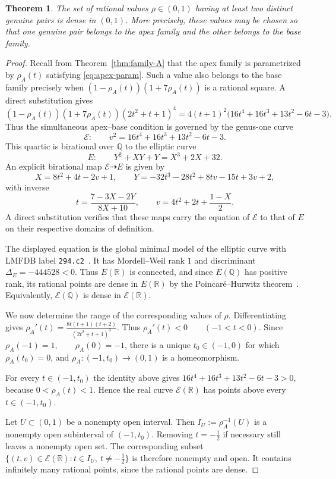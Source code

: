 \documentclass[11pt]{amsart}
\theoremstyle{plain}
\newtheorem{thm}{Theorem}[section]
\theoremstyle{remark}
\theoremstyle{plain}
\newcommand{\Q}{\mathbb{Q}}
\newcommand{\R}{\mathbb{R}}
\begin{document}
\begin{thm}\label{thm:two-pairs-dense}
The set of rational values $\rho\in(0,1)$ having at least two
distinct genuine pairs is dense in $(0,1)$. More precisely, these
values may be chosen so that one genuine pair belongs to the apex
family and the other belongs to the base family.
\end{thm}

\begin{proof}
Recall from Theorem~\ref{thm:family-A} that the apex family is
parametrized by $\rho_A(t)$ satisfying \eqref{eq:apex-param}. Such a value also belongs to the base family precisely
when
$(1-\rho_A(t))(1+7\rho_A(t))$
is a rational square. A direct substitution gives
\[
(1-\rho_A(t))(1+7\rho_A(t))
(2t^2+t+1)^4
=
4(t+1)^2
\bigl(16t^4+16t^3+13t^2-6t-3\bigr).
\]
Thus the simultaneous apex--base condition is governed by the genus-one curve
\[
\mathcal E:\qquad
v^2=16t^4+16t^3+13t^2-6t-3.
\]
This quartic is birational over $\Q$ to the elliptic curve
\[
E:\qquad Y^2+XY+Y=X^3+2X+32.
\]
An explicit birational map $\mathcal E\dashrightarrow E$ is given by
\[
X=8t^2+4t-2v+1,
\qquad
Y=-32t^3-28t^2+8tv-15t+3v+2,
\]
with inverse
\[
t=\frac{7-3X-2Y}{8X+10},
\qquad
v=4t^2+2t+\frac{1-X}{2}.
\]
A direct substitution verifies that these maps carry the equation of
$\mathcal E$ to that of $E$ on their respective domains of definition.

The displayed equation is the global minimal model of the elliptic
curve with LMFDB label \texttt{294.c2}~\cite{lmfdb}. It has
Mordell--Weil rank $1$ and discriminant
$\Delta_E=-444528<0$.
Thus $E(\R)$ is connected, and since $E(\Q)$ has positive rank, its
rational points are dense in $E(\R)$ by the Poincar\'e--Hurwitz
theorem~\cite[Satz~11, p.~78]{Skolem}. Equivalently,
$\mathcal E(\Q)$ is dense in $\mathcal E(\R)$.

We now determine the range of the corresponding values of $\rho$.
Differentiating gives
$\rho_A'(t) = \frac{8t(t+1)(t+2)} {(2t^2+t+1)^3}$.
Thus
$\rho_A'(t)<0 \qquad (-1<t<0)$.
Since
$\rho_A(-1)=1, \qquad \rho_A(0)=-1$,
there is a unique $t_0\in(-1,0)$ for which $\rho_A(t_0)=0$, and
$\rho_A:(-1,t_0)\longrightarrow(0,1)$
is a homeomorphism.

For every $t\in(-1,t_0)$ the identity above gives
$16t^4+16t^3+13t^2-6t-3>0$,
because $0<\rho_A(t)<1$. Hence the real curve $\mathcal E(\R)$ has
points above every $t\in(-1,t_0)$.

Let $U\subset(0,1)$ be a nonempty open interval. Then
$I_U:=\rho_A^{-1}(U)$
is a nonempty open subinterval of $(-1,t_0)$. Removing
$t=-\frac12$ if necessary still leaves a nonempty open set. The
corresponding subset
$\{(t,v)\in\mathcal E(\R):t\in I_U,\ t\ne-\tfrac12\}$
is therefore nonempty and open. It contains infinitely
many rational points, since the rational points are dense.


\end{proof}
\end{document}
